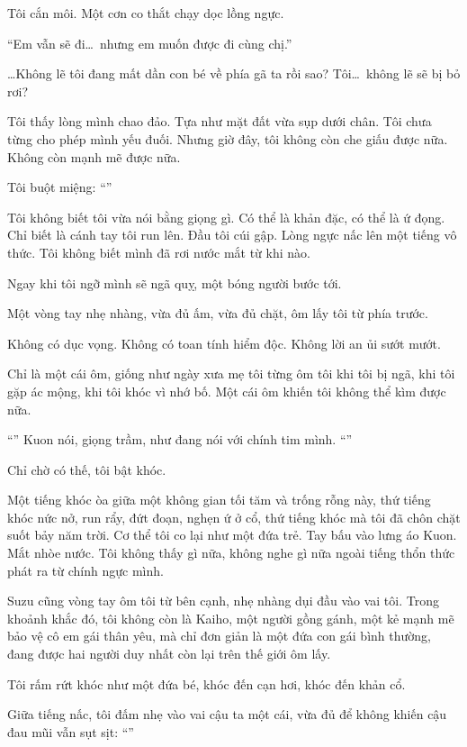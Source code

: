 \documentclass[../main.tex]{subfiles}
\begin{document}
Tôi cắn môi. Một cơn co thắt chạy dọc lồng ngực.

``Em vẫn sẽ đi\dots\ nhưng em muốn được đi cùng chị.''

\dots Không lẽ tôi đang mất dần con bé về phía gã ta rồi sao? Tôi\dots\ không lẽ sẽ bị bỏ rơi?

Tôi thấy lòng mình chao đảo. Tựa như mặt đất vừa sụp dưới chân. Tôi chưa từng cho phép mình yếu đuối. Nhưng giờ đây, tôi không còn che giấu được nữa. Không còn mạnh mẽ được nữa.

Tôi buột miệng: ``''

Tôi không biết tôi vừa nói bằng giọng gì. Có thể là khản đặc, có thể là ứ đọng. Chỉ biết là cánh tay tôi run lên. Đầu tôi cúi gập. Lòng ngực nấc lên một tiếng vô thức. Tôi không biết mình đã rơi nước mắt từ khi nào.

Ngay khi tôi ngỡ mình sẽ ngã quỵ, một bóng người bước tới.

Một vòng tay nhẹ nhàng, vừa đủ ấm, vừa đủ chặt, ôm lấy tôi từ phía trước.

Không có dục vọng. Không có toan tính hiểm độc. Không lời an ủi sướt mướt.

Chỉ là một cái ôm, giống như ngày xưa mẹ tôi từng ôm tôi khi tôi bị ngã, khi tôi gặp ác mộng, khi tôi khóc vì nhớ bố. Một cái ôm khiến tôi không thể kìm được nữa.

``'' Kuon nói, giọng trầm, như đang nói với chính tim mình. ``''

Chỉ chờ có thế, tôi bật khóc.

Một tiếng khóc òa giữa một không gian tối tăm và trống rỗng này, thứ tiếng khóc nức nở, run rẩy, đứt đoạn, nghẹn ứ ở cổ, thứ tiếng khóc mà tôi đã chôn chặt suốt bảy năm trời. Cơ thể tôi co lại như một đứa trẻ. Tay bấu vào lưng áo Kuon. Mắt nhòe nước. Tôi không thấy gì nữa, không nghe gì nữa ngoài tiếng thổn thức phát ra từ chính ngực mình.

Suzu cũng vòng tay ôm tôi từ bên cạnh, nhẹ nhàng dụi đầu vào vai tôi. Trong khoảnh khắc đó, tôi không còn là Kaiho, một người gồng gánh, một kẻ mạnh mẽ bảo vệ cô em gái thân yêu, mà chỉ đơn giản là một đứa con gái bình thường, đang được hai người duy nhất còn lại trên thế giới ôm lấy.

Tôi rấm rứt khóc như một đứa bé, khóc đến cạn hơi, khóc đến khản cổ.

Giữa tiếng nấc, tôi đấm nhẹ vào vai cậu ta một cái, vừa đủ để không khiến cậu đau mũi vẫn sụt sịt: ``''
\end{document}
